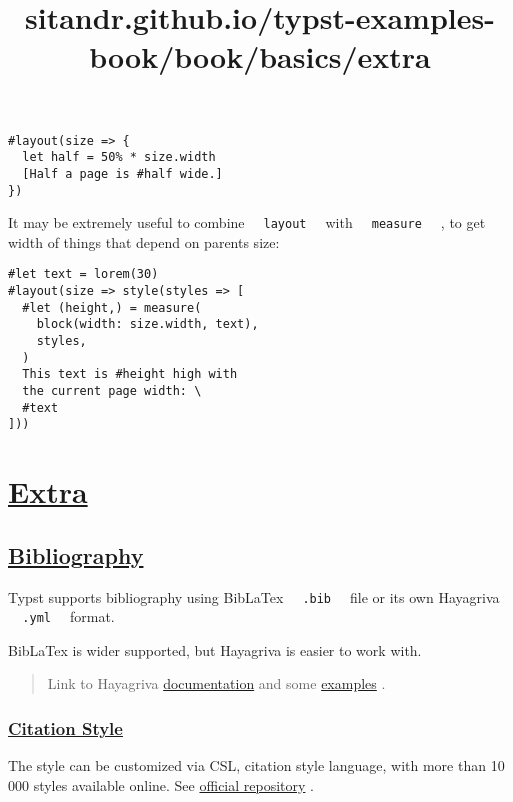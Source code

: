 \begin{verbatim}
#layout(size => {
  let half = 50% * size.width
  [Half a page is #half wide.]
})
\end{verbatim}

\pandocbounded{}

It may be extremely useful to combine
\texttt{\ }{\texttt{\ layout\ }}\texttt{\ } with
\texttt{\ }{\texttt{\ measure\ }}\texttt{\ } , to get width of things
that depend on parent\textquotesingle s size:

\begin{verbatim}
#let text = lorem(30)
#layout(size => style(styles => [
  #let (height,) = measure(
    block(width: size.width, text),
    styles,
  )
  This text is #height high with
  the current page width: \
  #text
]))
\end{verbatim}

\pandocbounded{}


\title{sitandr.github.io/typst-examples-book/book/basics/extra}

\section{\texorpdfstring{\hyperref[extra]{Extra}}{Extra}}\label{extra}

\subsection{\texorpdfstring{\hyperref[bibliography]{Bibliography}}{Bibliography}}\label{bibliography}

Typst supports bibliography using BibLaTex
\texttt{\ }{\texttt{\ .bib\ }}\texttt{\ } file or its own Hayagriva
\texttt{\ }{\texttt{\ .yml\ }}\texttt{\ } format.

BibLaTex is wider supported, but Hayagriva is easier to work with.

\begin{quote}
Link to Hayagriva
\href{https://github.com/typst/hayagriva/blob/main/docs/file-format.md}{documentation}
and some
\href{https://github.com/typst/hayagriva/blob/main/tests/data/basic.yml}{examples}
.
\end{quote}

\subsubsection{\texorpdfstring{\hyperref[citation-style]{Citation
Style}}{Citation Style}}\label{citation-style}

The style can be customized via CSL, citation style language, with more
than 10 000 styles available online. See
\href{https://github.com/citation-style-language/styles}{official
repository} .


